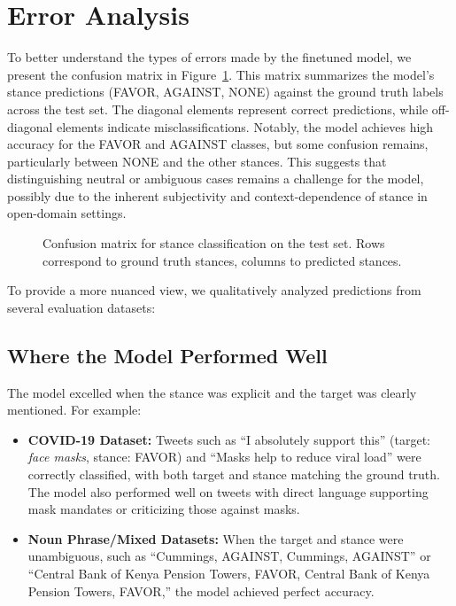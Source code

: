 \documentclass[twocolumn,11pt,letterpaper]{article}
\begin{document}
\section{Error Analysis}

To better understand the types of errors made by the finetuned model, we present the confusion matrix in Figure~\ref{fig:confusion_matrix}. This matrix summarizes the model's stance predictions (FAVOR, AGAINST, NONE) against the ground truth labels across the test set. The diagonal elements represent correct predictions, while off-diagonal elements indicate misclassifications. Notably, the model achieves high accuracy for the FAVOR and AGAINST classes, but some confusion remains, particularly between NONE and the other stances. This suggests that distinguishing neutral or ambiguous cases remains a challenge for the model, possibly due to the inherent subjectivity and context-dependence of stance in open-domain settings.

\begin{figure}[htbp]
    \centering
    
    \caption{Confusion matrix for stance classification on the test set. Rows correspond to ground truth stances, columns to predicted stances.}
    \label{fig:confusion_matrix}
    \end{figure}
To provide a more nuanced view, we qualitatively analyzed predictions from several evaluation datasets:

\subsection*{Where the Model Performed Well}
The model excelled when the stance was explicit and the target was clearly mentioned. For example:
\begin{itemize}
    \item \textbf{COVID-19 Dataset:} Tweets such as ``I absolutely support this'' (target: \textit{face masks}, stance: FAVOR) and ``Masks help to reduce viral load'' were correctly classified, with both target and stance matching the ground truth. The model also performed well on tweets with direct language supporting mask mandates or criticizing those against masks.
    \item \textbf{Noun Phrase/Mixed Datasets:} When the target and stance were unambiguous, such as ``Cummings, AGAINST, Cummings, AGAINST'' or ``Central Bank of Kenya Pension Towers, FAVOR, Central Bank of Kenya Pension Towers, FAVOR,'' the model achieved perfect accuracy.
\end{itemize}
\end{document}
